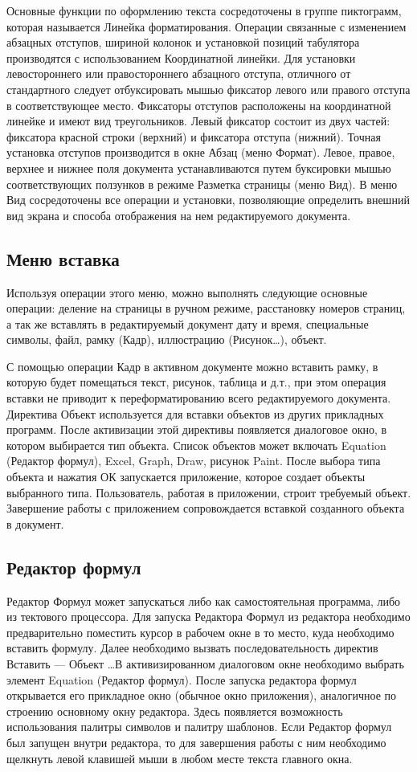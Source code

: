 \documentclass[a4paper]{article}
\begin{document}
Основные функции по оформлению текста сосредоточены в группе пиктограмм, которая называется Линейка форматирования.
Операции связанные с изменением абзацных отступов, шириной колонок и установкой позиций табулятора производятся с использованием Координатной линейки. Для установки левостороннего или правостороннего абзацного отступа, отличного от стандартного следует отбуксировать мышью фиксатор левого или правого отступа в соответствующее место. Фиксаторы отступов расположены на координатной линейке и имеют вид треугольников. Левый фиксатор состоит из двух частей: фиксатора красной строки (верхний) и фиксатора отступа (нижний). Точная установка отступов производится в окне Абзац (меню Формат). Левое, правое, верхнее и нижнее поля документа устанавливаются путем буксировки мышью соответствующих ползунков в режиме Разметка страницы (меню Вид). В меню Вид сосредоточены все операции и установки, позволяющие определить внешний вид экрана и способа отображения на нем редактируемого документа.

\subsection{Меню вставка}
Используя операции этого меню, можно выполнять следующие основные операции: деление на страницы в ручном режиме, расстановку номеров страниц, а так же вставлять в редактируемый документ дату и время, специальные символы, файл, рамку (Кадр), иллюстрацию (Рисунок\dots), объект.

С помощью операции Кадр в активном документе можно вставить рамку, в которую будет помещаться текст, рисунок, таблица и д.т., при этом операция вставки не приводит к переформатированию всего редактируемого документа. Директива Объект используется для вставки объектов из других прикладных программ. После активизации этой директивы появляется диалоговое окно, в котором выбирается тип объекта. Список объектов может включать Equation (Редактор формул), Excel, Graph, Draw, рисунок Paint. После выбора типа объекта и нажатия ОК запускается приложение, которое создает объекты выбранного типа. Пользователь, работая в приложении, строит требуемый объект. Завершение работы с приложением сопровождается вставкой созданного объекта в документ.

\subsection{Редактор формул}
Редактор Формул может запускаться либо как самостоятельная программа, либо из тектового процессора. Для запуска Редактора Формул из редактора необходимо предварительно поместить курсор в рабочем окне в то место, куда необходимо вставить формулу. Далее необходимо вызвать последовательность директив Вставить --- Объект \dots В активизированном диалоговом окне необходимо выбрать элемент Equation (Редактор формул). После запуска редактора формул открывается его прикладное окно (обычное окно приложения), аналогичное по строению основному окну редактора. Здесь появляется возможность использования палитры символов и палитру шаблонов.
Если Редактор формул был запущен внутри редактора, то для завершения работы с ним необходимо щелкнуть левой клавишей мыши в любом месте текста главного окна.
\end{document}

